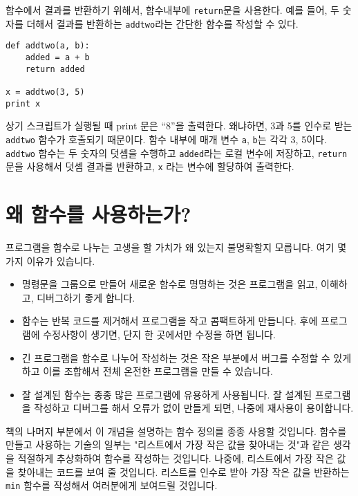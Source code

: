 함수에서 결과를 반환하기 위해서, 함수내부에 {\tt return}문을 사용한다.
예를 들어, 두 숫자를 더해서 결과를 반환하는 {\tt addtwo}라는 간단한 함수를 작성할 수 있다. 

\beforeverb
\begin{verbatim}
def addtwo(a, b):
    added = a + b
    return added

x = addtwo(3, 5)
print x
\end{verbatim}
\afterverb
%

상기 스크립트가 실행될 때 print 문은 ``8''을 출력한다. 왜냐하면, 3과 5를 인수로 받는 {\tt addtwo} 함수가 호출되기 때문이다.
함수 내부에 매개 변수 {\tt a}, {\tt b}는 각각 3, 5이다.
 {\tt addtwo} 함수는 두 숫자의 덧셈을 수행하고  {\tt added}라는 로컬 변수에 저장하고, {\tt return}문을 사용해서 덧셈 결과를 반환하고,
  {\tt x} 라는 변수에 할당하여 출력한다.

\section{왜 함수를 사용하는가?}

프로그램을 함수로 나누는 고생을 할 가치가 왜 있는지 불명확할지 모릅니다. 여기 몇 가지 이유가 있습니다.

\begin{itemize}

\item 명령문을 그룹으로 만들어 새로운 함수로 명명하는 것은 프로그램을 읽고, 이해하고, 디버그하기 좋게 합니다. 

\item 함수는 반복 코드를 제거해서 프로그램을 작고 콤팩트하게 만듭니다. 후에 프로그램에 수정사항이 생기면, 단지 한 곳에서만 수정을 하면 됩니다.

\item 긴 프로그램을 함수로 나누어 작성하는 것은 작은 부분에서 버그를 수정할 수 있게 하고 이를 조합해서 전체 온전한 프로그램을 만들 수 있습니다.

\item 잘 설계된 함수는 종종 많은 프로그램에 유용하게 사용됩니다. 잘 설계된 프로그램을 작성하고 디버그를 해서 오류가 없이 만들게 되면, 나중에 재사용이 용이합니다.

\end{itemize}

책의 나머지 부분에서 이 개념을 설명하는 함수 정의를 종종 사용할 것입니다. 함수를 만들고 사용하는 기술의 일부는 "리스트에서 가장 작은 값을 찾아내는 것"과 같은 
생각을 적절하게 추상화하여 함수를 작성하는 것입니다. 나중에, 리스트에서 가장 작은 값을 찾아내는 코드를 보여 줄 것입니다. 리스트를 인수로 받아 가장 작은 값을 
반환하는 {\tt min} 함수를 작성해서 여러분에게 보여드릴 것입니다.

